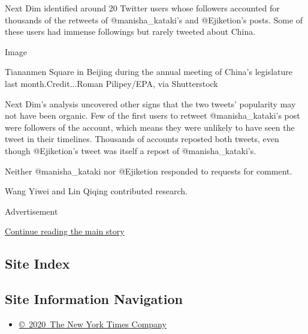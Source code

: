 Next Dim identified around 20 Twitter users whose followers accounted
for thousands of the retweets of @manisha\_kataki's and @Ejiketion's
posts. Some of these users had immense followings but rarely tweeted
about China.

Image

Tiananmen Square in Beijing during the annual meeting of China's
legislature last month.Credit...Roman Pilipey/EPA, via Shutterstock

Next Dim's analysis uncovered other signs that the two tweets'
popularity may not have been organic. Few of the first users to retweet
@manisha\_kataki's post were followers of the account, which means they
were unlikely to have seen the tweet in their timelines. Thousands of
accounts reposted both tweets, even though @Ejiketion's tweet was itself
a repost of @manisha\_kataki's.

Neither @manisha\_kataki nor @Ejiketion responded to requests for
comment.

Wang Yiwei and Lin Qiqing contributed research.

Advertisement

\protect\hyperlink{after-bottom}{Continue reading the main story}

\hypertarget{site-index}{%
\subsection{Site Index}\label{site-index}}

\hypertarget{site-information-navigation}{%
\subsection{Site Information
Navigation}\label{site-information-navigation}}

\begin{itemize}
\tightlist
\item
  \href{https://help.nytimes.com/hc/en-us/articles/115014792127-Copyright-notice}{©~2020~The
  New York Times Company}
\end{itemize}

